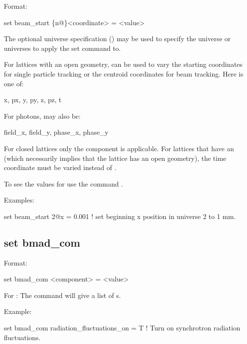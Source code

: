{{Format:
\begin{example}
  set beam_start \{n@\}<coordinate> = <value>
\end{example}

The optional  universe specification () may be used to specify the universe
or universes to apply the set command to.

For lattices with an open geometry,  can be used to vary
the starting coordinates for single particle tracking or the centroid coordinates for beam
tracking. Here  is one of:
\begin{example}
  x, px, y, py, z, pz, t
\end{example}
For photons,  may also be:
\begin{example}
  field_x, field_y, phase_x, phase_y
\end{example}
For closed lattices only the  component is applicable. For lattices that have an
 (which necessarily implies that the lattice has an open geometry), the time
 coordinate must be varied instead of .

To see the values for  use the command .

Examples:
\begin{example}
  set beam_start 2@x = 0.001         ! set beginning x position in universe 2 to 1 mm.
\end{example}


\subsection{set bmad_com}
\label{s:set.bmad.com}

Format:
\begin{example}
  set bmad_com <component> = <value>
\end{example}


For : The  command will give a list of 
s.

Example:
\begin{example}
  set bmad_com radiation_fluctuations_on = T ! Turn on synchrotron radiation fluctuations.
\end{example}


}}

